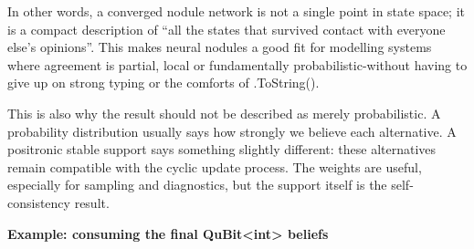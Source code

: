 \documentclass[a4paper,11pt]{article}
\begin{document}
In other words, a converged nodule network is not a single point in state space; it is a compact description of ``all the states that survived contact with everyone else's opinions''. This makes neural nodules a good fit for modelling systems where agreement is partial, local or fundamentally probabilistic-without having to give up on strong typing or the comforts of .ToString().

This is also why the result should not be described as merely probabilistic. A
probability distribution usually says how strongly we believe each alternative.
A positronic stable support says something slightly different: these alternatives
remain compatible with the cyclic update process. The weights are useful, especially
for sampling and diagnostics, but the support itself is the self-consistency result.

  \textbf{Example: consuming the final QuBit\textless int\textgreater{} beliefs}
\end{document}
